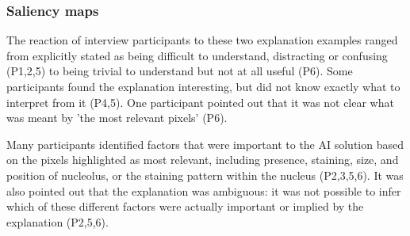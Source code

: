 
\subsubsection{Saliency maps}



The reaction of interview participants to these two explanation examples ranged from explicitly stated as being difficult to understand, distracting or confusing (P1,2,5) to being trivial to understand but not at all useful (P6). Some participants found the explanation interesting, but did not know exactly what to interpret from it (P4,5). One participant pointed out that it was not clear what was meant by 'the most relevant pixels' (P6).


Many participants identified factors that were important to the AI solution based on the pixels highlighted as most relevant, including presence, staining, size, and position of nucleolus, or the staining pattern within the nucleus (P2,3,5,6). It was also pointed out that the explanation was ambiguous: it was not possible to infer which of these different factors were actually important or implied by the explanation (P2,5,6).


